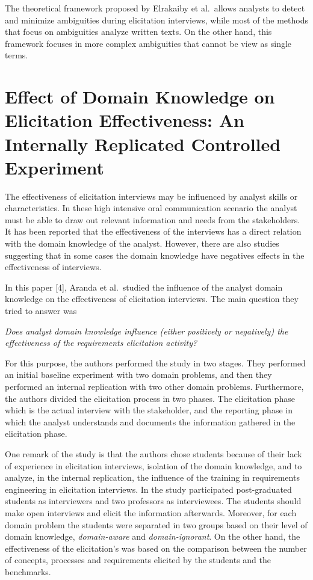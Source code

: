 \documentclass[]{llncs}
\begin{document}
The theoretical framework proposed by Elrakaiby et al.~allows analysts
to detect and minimize ambiguities during elicitation interviews, while
most of the methods that focus on ambiguities analyze written texts. On
the other hand, this framework focuses in more complex ambiguities that
cannot be view as single terms.

\hypertarget{effect-of-domain-knowledge-on-elicitation-effectiveness-an-internally-replicated-controlled-experiment}{%
\section{Effect of Domain Knowledge on Elicitation Effectiveness: An
Internally Replicated Controlled
Experiment}\label{effect-of-domain-knowledge-on-elicitation-effectiveness-an-internally-replicated-controlled-experiment}}

The effectiveness of elicitation interviews may be influenced by analyst
skills or characteristics. In these high intensive oral communication
scenario the analyst must be able to draw out relevant information and
needs from the stakeholders. It has been reported that the effectiveness
of the interviews has a direct relation with the domain knowledge of the
analyst. However, there are also studies suggesting that in some cases
the domain knowledge have negatives effects in the effectiveness of
interviews.

In this paper {[}4{]}, Aranda et al.~studied the influence of the
analyst domain knowledge on the effectiveness of elicitation interviews.
The main question they tried to answer was

\emph{Does analyst domain knowledge influence (either positively or
negatively) the effectiveness of the requirements elicitation activity?}

For this purpose, the authors performed the study in two stages. They
performed an initial baseline experiment with two domain problems, and
then they performed an internal replication with two other domain
problems. Furthermore, the authors divided the elicitation process in
two phases. The elicitation phase which is the actual interview with the
stakeholder, and the reporting phase in which the analyst understands
and documents the information gathered in the elicitation phase.

One remark of the study is that the authors chose students because of
their lack of experience in elicitation interviews, isolation of the
domain knowledge, and to analyze, in the internal replication, the
influence of the training in requirements engineering in elicitation
interviews. In the study participated post-graduated students as
interviewers and two professors as interviewees. The students should
make open interviews and elicit the information afterwards. Moreover,
for each domain problem the students were separated in two groups based
on their level of domain knowledge, \emph{domain-aware} and
\emph{domain-ignorant}. On the other hand, the effectiveness of the
elicitation's was based on the comparison between the number of
concepts, processes and requirements elicited by the students and the
benchmarks.
\end{document}
